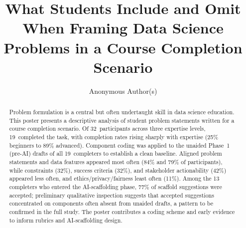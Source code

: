 \documentclass[sigconf,screen,anonymous]{acmart}
\begin{document}
\title{What Students Include and Omit When Framing Data Science Problems in a Course Completion Scenario}

\author{Anonymous Author(s)}

\begin{abstract}
Problem formulation is a central but often undertaught skill in data science education. This poster presents a descriptive analysis of student problem statements written for a course completion scenario. Of 32~participants across three expertise levels, 19~completed the task, with completion rates rising sharply with expertise (25\% beginners to 89\% advanced). Component coding was applied to the unaided Phase~1 (pre-AI) drafts of all 19~completers to establish a clean baseline. Aligned problem statements and data features appeared most often (84\% and 79\% of participants), while constraints (32\%), success criteria (32\%), and stakeholder actionability (42\%) appeared less often, and ethics/privacy/fairness least often (11\%). Among the 13 completers who entered the AI-scaffolding phase, 77\% of scaffold suggestions were accepted; preliminary qualitative inspection suggests that accepted suggestions concentrated on components often absent from unaided drafts, a pattern to be confirmed in the full study. The poster contributes a coding scheme and early evidence to inform rubrics and AI-scaffolding design.
\end{abstract}


\maketitle
\end{document}
